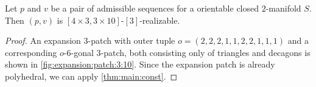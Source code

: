 \clearpage
\begin{theorem}
  Let $p$ and $v$ be a pair of admissible sequences for a orientable closed $2$-manifold $S$. Then $(p, v)$ is $[4 \times 3, 3 \times 10]$-$[3]$-realizable.
  \begin{proof}
    An expansion $3$-patch with outer tuple $o = (2, 2, 2, 1, 1, 2, 2, 1, 1, 1)$ and a corresponding $o$-$6$-gonal $3$-patch, both consisting only of triangles and decagons is shown in \autoref{fig:expansion:patch:3:10}. Since the expansion patch is already polyhedral, we can apply \autoref{thm:main:const}.
{\par\vspace*{\fill}}
  \end{proof}
\end{theorem}
{\par\vspace*{\fill}}
